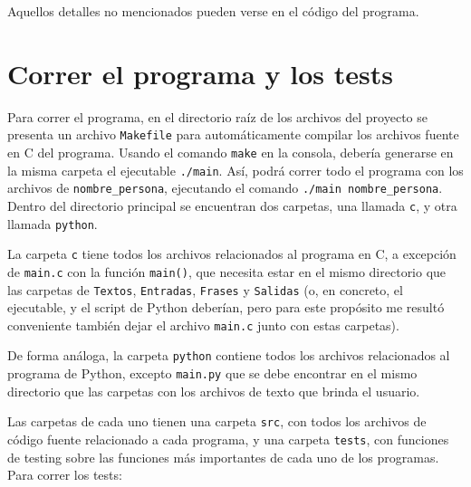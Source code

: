 \documentclass[a4paper]{article}
\begin{document}
Aquellos detalles no mencionados pueden verse en el código del programa.

\section{Correr el programa y los tests}

Para correr el programa, en el directorio raíz de los archivos del proyecto se presenta un archivo \texttt{Makefile} para automáticamente compilar los archivos fuente en C del programa. Usando el comando \texttt{make} en la consola, debería generarse en la misma carpeta el ejecutable \texttt{./main}. Así, podrá correr todo el programa con los archivos de \texttt{nombre\_persona}, ejecutando el comando \texttt{./main nombre\_persona}. \\

Dentro del directorio principal se encuentran dos carpetas, una llamada \texttt{c}, y otra llamada \texttt{python}. 

La carpeta \texttt{c} tiene todos los archivos relacionados al programa en C, a excepción de \texttt{main.c} con la función \texttt{main()}, que necesita estar en el mismo directorio que las carpetas de \texttt{Textos}, \texttt{Entradas}, \texttt{Frases} y \texttt{Salidas} (o, en concreto, el ejecutable, y el script de Python deberían, pero para este propósito me resultó conveniente también dejar el archivo \texttt{main.c} junto con estas carpetas).

De forma análoga, la carpeta \texttt{python} contiene todos los archivos relacionados al programa de Python, excepto \texttt{main.py} que se debe encontrar en el mismo directorio que las carpetas con los archivos de texto que brinda el usuario.

Las carpetas de cada uno tienen una carpeta \texttt{src}, con todos los archivos de código fuente relacionado a cada programa, y una carpeta \texttt{tests}, con funciones de testing sobre las funciones más importantes de cada uno de los programas. Para correr los tests:
\end{document}
